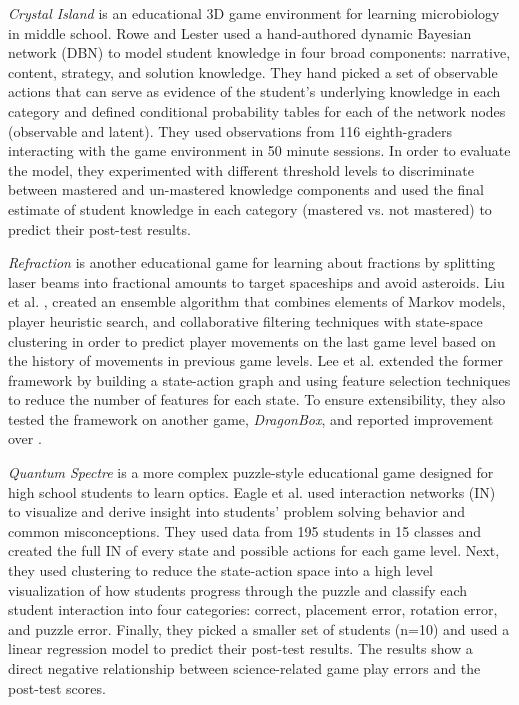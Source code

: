 \documentclass{sigchi}
\begin{document}
\textit{Crystal Island} \cite{rowe2010integrating} is an educational 3D game environment for learning microbiology in middle school. 
Rowe and Lester \cite{rowe2010modeling} used a hand-authored dynamic Bayesian network (DBN) to model student knowledge in four broad components: narrative, content, strategy, and solution knowledge. 
They hand picked a set of observable actions that can serve as evidence of the student’s underlying knowledge in each category and defined conditional probability tables for each of the network nodes (observable and latent).
They used observations from 116 eighth-graders interacting with the game environment in 50 minute sessions.
In order to evaluate the model, they experimented with different threshold levels to discriminate between mastered and un-mastered knowledge components and used the final estimate of student knowledge in each category (mastered vs. not mastered) to predict their post-test results.

\textit {Refraction} \cite{andersen2010gameplay} is another educational game for learning about fractions by splitting laser beams into fractional amounts to target spaceships and avoid asteroids. 
Liu et al. \cite{liu2013predicting}, created an ensemble algorithm that combines elements of Markov models, player heuristic search, and collaborative filtering techniques with state-space clustering in order to predict player movements on the last game level based on the history of movements in previous game levels. 
Lee et al. \cite{lee2014learning} extended the former framework by building a state-action graph and using feature selection techniques to reduce the number of features for each state. 
To ensure extensibility, they also tested the framework on another game, \textit {DragonBox}, and reported improvement over \cite{liu2013predicting}.

\textit {Quantum Spectre} is a more complex puzzle-style educational game designed for high school students to learn optics. 
Eagle et al. \cite{eagle2015measuring} used interaction networks (IN) to visualize and derive insight into students' problem solving behavior and common misconceptions. 
They used data from 195 students in 15 classes and created the full IN of every state and possible actions for each game level. 
Next, they used clustering to reduce the state-action space into a high level visualization of how students progress through the puzzle and classify each student interaction into four categories: correct, placement error, rotation error, and puzzle error. 
Finally, they picked a smaller set of students (n=10) and used a linear regression model to predict their post-test results.
The results show a direct negative relationship between science-related game play errors and the post-test scores.
\end{document}
